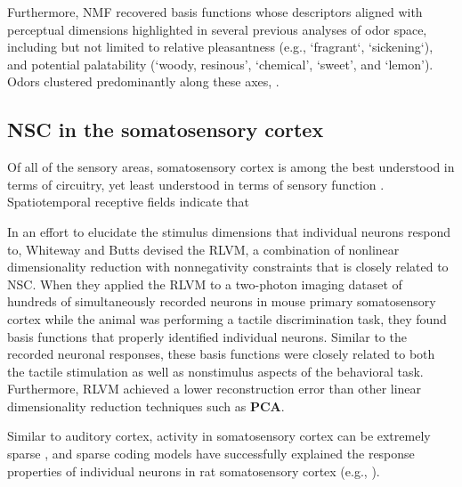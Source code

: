 Furthermore, \ac{NMF} recovered basis functions whose descriptors aligned
with perceptual dimensions highlighted in several previous analyses of odor space,
including but not limited to relative pleasantness (e.g., `fragrant`, `sickening`), 
and potential palatability (`woody, resinous', `chemical', `sweet', and `lemon').
Odors clustered predominantly along these axes,
 \cite{Castro2013}.


\subsection*{NSC in the somatosensory cortex}
Of all of the sensory areas,
somatosensory cortex is among the best understood in terms of circuitry,
yet least understood in terms of sensory function
\cite{Ramirez2014}.
Spatiotemporal receptive fields indicate that 

In an effort to elucidate the stimulus dimensions that 
individual  neurons respond to,
Whiteway and Butts \cite{WhitewayButts2017} devised the \ac{RLVM},
a combination of nonlinear dimensionality reduction with nonnegativity constraints
that is closely related to \ac{NSC}.
When they applied the \ac{RLVM} to 
a two-photon imaging dataset of hundreds of simultaneously recorded neurons 
in mouse primary somatosensory cortex while the animal was performing
a tactile discrimination task,
they found basis functions that properly identified individual neurons.
Similar to the recorded neuronal responses, these basis functions were closely related
to both the tactile stimulation as well as 
nonstimulus aspects of the behavioral task.
Furthermore, \ac{RLVM} achieved a lower reconstruction error than other
linear dimensionality reduction techniques such as \textbf{\ac{PCA}}.

Similar to auditory cortex,
activity in  somatosensory cortex can be extremely sparse
\cite{Jadhav2009,oconnor2010,Crochet2011},
and sparse coding models have successfully explained the response properties
of individual neurons in rat somatosensory cortex (e.g., \cite{Hafner2004}).


